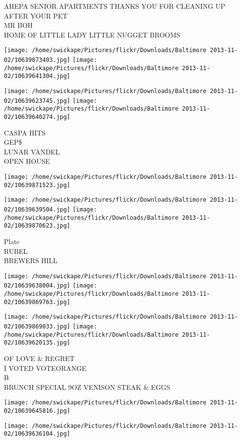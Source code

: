 \documentclass[10pt,letterpaper]{article}
\begin{document}
AHEPA SENIOR APARTMENTS THANKS YOU FOR CLEANING UP AFTER YOUR PET\\
MR BOH\\
HOME OF LITTLE LADY LITTLE NUGGET BROOMS
\pagebreak

\texttt{[image: /home/swickape/Pictures/flickr/Downloads/Baltimore 2013-11-02/10639873403.jpg]}
\texttt{[image: /home/swickape/Pictures/flickr/Downloads/Baltimore 2013-11-02/10639641304.jpg]}

\texttt{[image: /home/swickape/Pictures/flickr/Downloads/Baltimore 2013-11-02/10639623745.jpg]}
\texttt{[image: /home/swickape/Pictures/flickr/Downloads/Baltimore 2013-11-02/10639640274.jpg]}

CASPA HITS\\
GEP\$\\
LUNAR VANDEL\\
OPEN HOUSE
\pagebreak

\texttt{[image: /home/swickape/Pictures/flickr/Downloads/Baltimore 2013-11-02/10639871523.jpg]}

\vspace{0.25in}
\texttt{[image: /home/swickape/Pictures/flickr/Downloads/Baltimore 2013-11-02/10639639504.jpg]}
\texttt{[image: /home/swickape/Pictures/flickr/Downloads/Baltimore 2013-11-02/10639870623.jpg]}

Plate\\
RUBEL\\
BREWERS HILL
\pagebreak

\texttt{[image: /home/swickape/Pictures/flickr/Downloads/Baltimore 2013-11-02/10639638004.jpg]}
\texttt{[image: /home/swickape/Pictures/flickr/Downloads/Baltimore 2013-11-02/10639869763.jpg]}

\texttt{[image: /home/swickape/Pictures/flickr/Downloads/Baltimore 2013-11-02/10639869033.jpg]}
\texttt{[image: /home/swickape/Pictures/flickr/Downloads/Baltimore 2013-11-02/10639620135.jpg]}

OF LOVE \& REGRET\\
I VOTED VOTEORANGE\\
B\\
BRUNCH SPECIAL 9OZ VENISON STEAK \& EGGS
\pagebreak

\texttt{[image: /home/swickape/Pictures/flickr/Downloads/Baltimore 2013-11-02/10639645816.jpg]}

\vspace{0.25in}
\texttt{[image: /home/swickape/Pictures/flickr/Downloads/Baltimore 2013-11-02/10639636104.jpg]}
\end{document}
